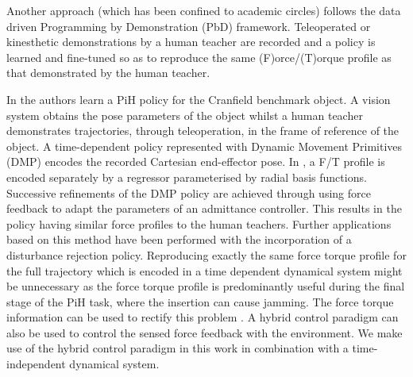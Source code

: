 

Another approach (which has been confined to academic circles) follows the data driven 
Programming by Demonstration (PbD) framework. Teleoperated or kinesthetic demonstrations by a human teacher 
are recorded and a policy is learned and fine-tuned so as to reproduce the same (F)orce/(T)orque profile as 
that demonstrated by the human teacher. 

In \cite{fast_peg_pbd_icmc_2014} the authors learn a PiH policy for the Cranfield benchmark object.
A vision system obtains the pose parameters of the object whilst a human teacher  
demonstrates trajectories, through teleoperation, in the frame of reference of the object. 
A time-dependent policy represented with Dynamic Movement Primitives (DMP) \cite{Schaal04learningmovement} 
encodes the recorded Cartesian end-effector pose. In \cite{trans_workpiece_icra_2013}, a F/T profile 
is encoded separately by a regressor parameterised by radial basis functions. Successive refinements of the DMP policy are achieved through 
using force feedback to adapt the parameters of an admittance controller. This results in the policy having
similar force profiles to the human teachers. Further applications based on this method have been 
performed \cite{sol_pdg_pbd_2014} with the incorporation of a disturbance rejection policy. Reproducing exactly 
the same force torque profile for the full trajectory which is encoded in a time dependent dynamical system might be unnecessary as the force torque profile is 
predominantly useful during the final stage of the PiH task, where the insertion can cause jamming. 
The force torque information can be used to rectify this problem \cite[Chap. 5]{Kronander2015}. A 
hybrid control paradigm \cite{hybrid_1992} can also be used to control the sensed force feedback with the environment.
We make use of the hybrid control paradigm in this work in combination with a time-independent dynamical system.

